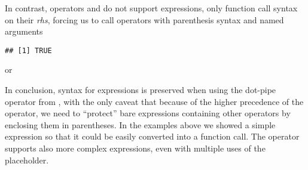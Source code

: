 \documentclass[krantz2]{krantz}\usepackage{knitr}
\begin{document}
In contrast, operators \Roperator{\textbar >} and \Roperator{\%>\%} do not support expressions, only function call syntax on their \textit{rhs}, forcing us to call operators with parenthesis syntax and named arguments

\begin{knitrout}\footnotesize
{}\color{fgcolor}\begin{kframe}
\begin{alltt}
 \hlstd{(} \hlstd{= _,}  \hlstd{=} \hlstd{)} \hlkwb{->} 
\end{alltt}
\begin{verbatim}
## [1] TRUE
\end{verbatim}
\end{kframe}
\end{knitrout}

or

\begin{knitrout}\footnotesize
{}\color{fgcolor}
\end{knitrout}

In conclusion, \Rlang syntax for expressions is preserved when using the dot-pipe operator from , with the only caveat that because of the higher precedence of the  operator, we need to ``protect'' bare expressions containing other operators by enclosing them in parentheses. In the examples above we showed a simple expression so that it could be easily converted into a function call. The  operator supports also more complex expressions, even with multiple uses of the placeholder.

\begin{knitrout}\footnotesize
{}\color{fgcolor}
\end{knitrout}
\end{document}
